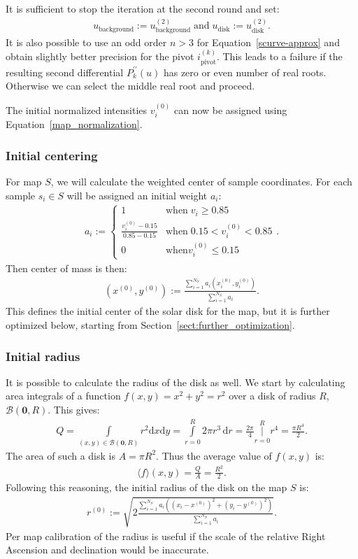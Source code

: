 \documentclass{aa}
\newcommand{\eqnl}[2]{\begin{eqnarray}\label{#1}#2\end{eqnarray}}
\newcommand{\intef}[4]{\int \limits_{#1 = #2}^{#3} \! #4 \, \mathrm{d} #1}
\newcommand{\intes}[4]{\operatorname{\Bigg|} \limits_{#1 = #2}^{#3} \!\!\!\!\! #4}
\newcommand{\ave}[1]{\langle #1 \rangle}
\newcommand{\dd}[0]{\mathrm{d}}
\newcommand{\s}[2]{{#1}_{\mathrm{#2}}}
\begin{document}
  It is sufficient to stop the iteration at the second round and set:
  \eqnl{scurve-converged}{
  \s{u}{background} := \s{u}{background}^{(2)} \; \text{and} \; \s{u}{disk} := \s{u}{disk}^{(2)} \text{.}
  }
  It is also possible to use an odd order $n > 3$ for Equation~\ref{scurve-approx} and obtain slightly better precision 
  for the pivot $\s{i}{pivot}^{(k)}$. This leads to a failure if the resulting second differential $P_k^{\prime\prime}(u)$ 
  has zero or even number of real roots. Otherwise we can select the middle real root and proceed.

  The initial normalized intensities $v_i^{(0)}$ can now be assigned using Equation~\ref{map_normalization}.
  
  \subsubsection{Initial centering}\label{sect:initial-centering}

  For map $S$, we will calculate the weighted center of sample coordinates. For each sample $s_i \in S$ will be assigned an initial weight $a_i$:
  \eqnl{centering-initial-weight}{
  a_i := \begin{cases} 1 & \text{when}\; v_i \ge 0.85 \\ \frac{v_i^{(0)} - 0.15}{0.85 - 0.15} & \text{when}\; 0.15 < v_i^{(0)} < 0.85 \\ 0 & \text{when} v_i^{(0)} \le 0.15 \end{cases} \text{.}
  }
  Then center of mass is then:
  \eqnl{centering-center-of-mass}{
  \left( x^{(0)}, y^{(0)} \right) := \frac{\sum \limits_{i=1}^{N_S} a_i \left( x_i^{(0)}, y_i^{(0)} \right)}{\sum \limits_{i=1}^{N_S} a_i} \text{.}
  }
  This defines the initial center of the solar disk for the map, but it is further optimized below, starting from Section~\ref{sect:further_optimization}.

  \subsubsection{Initial radius}\label{sect:initial-radius}

  It is possible to calculate the radius of the disk as well. We start by calculating area integrals of a function $f(x,y) = x^2+y^2 = r^2$ over a disk of radius $R$, $\mathcal{B}(\bm{0},R)$. This gives:
  \eqnl{initial_radius}{
  Q = \int \limits_{(x,y) \in \mathcal{B}(\bm{0},R)} \! r^2 \dd x \dd y = \intef{r}{0}{R}{2 \pi r^3} = \frac{2 \pi}{4} \intes{r}{0}{R}{r^4} = \frac{\pi R^4}{2} \text{.}
  }
  The area of such a disk is $A = \pi R^2$. Thus the average value of $f(x,y)$ is:
  \eqnl{initial_radius2}{
  \ave f(x,y) = \frac{Q}{A} = \frac{R^2}{2} \text{.}
  }
  Following this reasoning, the initial radius of the disk on the map $S$ is:
  \eqnl{initial_radius3}{
  r^{(0)} := \sqrt{2 \frac{\sum \limits_{i=1}^{N_S} a_i \left( \left( x_i - x^{(0)} \right)^2 + \left( y_i - y^{(0)} \right)^2 \right)}{\sum \limits_{i=1}^{N_S} a_i}} \text{.}
  }
  Per map calibration of the radius is useful if the scale of the relative Right Ascension and declination would be inaccurate.
\end{document}
